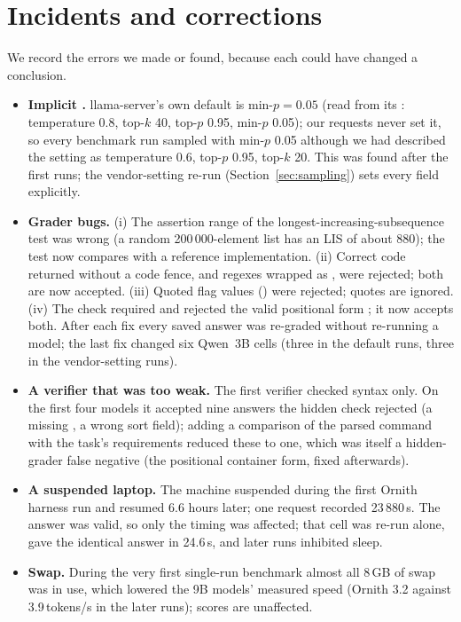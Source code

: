 \section{Incidents and corrections}
\label{app:incidents}
We record the errors we made or found, because each could have changed a conclusion.
\begin{itemize}
\item \textbf{Implicit .} llama-server's own default is $\mathrm{min}\text{-}p=0.05$ (read from its : temperature 0.8, top-$k$ 40, top-$p$ 0.95, min-$p$ 0.05); our requests never set it, so every benchmark run sampled with min-$p$ 0.05 although we had described the setting as temperature 0.6, top-$p$ 0.95, top-$k$ 20. This was found after the first runs; the vendor-setting re-run (Section~\ref{sec:sampling}) sets every field explicitly.
\item \textbf{Grader bugs.} (i) The assertion range of the longest-increasing-subsequence test was wrong (a random 200\,000-element list has an LIS of about 880); the test now compares with a reference implementation. (ii) Correct code returned without a code fence, and regexes wrapped as , were rejected; both are now accepted. (iii) Quoted flag values () were rejected; quotes are ignored. (iv) The  check required  and rejected the valid positional form ; it now accepts both. After each fix every saved answer was re-graded without re-running a model; the last fix changed six Qwen~3B cells (three in the default runs, three in the vendor-setting runs).
\item \textbf{A verifier that was too weak.} The first  verifier checked syntax only. On the first four models it accepted nine answers the hidden check rejected (a missing , a wrong sort field); adding a comparison of the parsed command with the task's requirements reduced these to one, which was itself a hidden-grader false negative (the positional container form, fixed afterwards).
\item \textbf{A suspended laptop.} The machine suspended during the first Ornith harness run and resumed 6.6 hours later; one request recorded 23\,880\,s. The answer was valid, so only the timing was affected; that cell was re-run alone, gave the identical answer in 24.6\,s, and later runs inhibited sleep.
\item \textbf{Swap.} During the very first single-run benchmark almost all 8\,GB of swap was in use, which lowered the 9B models' measured speed (Ornith 3.2 against 3.9\,tokens/s in the later runs); scores are unaffected.

\end{itemize}

